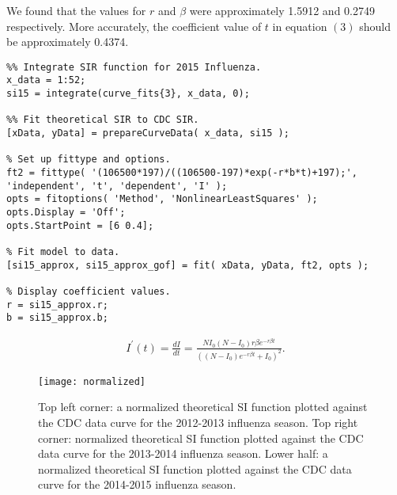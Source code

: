 \documentclass[a0, landscape, final]{a0poster}
\begin{document}
\begin{multicols}{4}
\vfill
\columnbreak

\begin{definition*}[\textcolor{white}{Determining Parameters}]

We found that the values for $r$ and $\beta$ were approximately 1.5912 and 0.2749 respectively. More accurately, the coefficient value of $t$ in equation $(3)$ should be approximately 0.4374. \\

\begin{minipage}{\linewidth}
\begin{lstlisting}
%% Integrate SIR function for 2015 Influenza.
x_data = 1:52;
si15 = integrate(curve_fits{3}, x_data, 0);

%% Fit theoretical SIR to CDC SIR.
[xData, yData] = prepareCurveData( x_data, si15 );

% Set up fittype and options.
ft2 = fittype( '(106500*197)/((106500-197)*exp(-r*b*t)+197);', 'independent', 't', 'dependent', 'I' );
opts = fitoptions( 'Method', 'NonlinearLeastSquares' );
opts.Display = 'Off';
opts.StartPoint = [6 0.4];

% Fit model to data.
[si15_approx, si15_approx_gof] = fit( xData, yData, ft2, opts );

% Display coefficient values.
r = si15_approx.r;
b = si15_approx.b;
\end{lstlisting}
\end{minipage}

\end{definition*}


\begin{definition*}[\textcolor{white}{Results}]
\begin{align}
 I^{\prime}(t) = \frac{dI}{dt} = \frac{ NI_0(N-I_0)r \beta e^{-r\beta t} }{ \left( (N-I_0)e^{-r\beta t} + I_0 \right)^2 }.
\end{align}
%
\begin{figure}[H]
\begin{center}
\texttt{[image: normalized]}
\caption{Top left corner: a normalized theoretical SI function plotted against the CDC data curve for the 2012-2013 influenza season. 
		Top right corner: normalized theoretical SI function plotted against the CDC data curve for the 2013-2014 influenza season.
		Lower half: a normalized theoretical SI function plotted against the CDC data curve for the 2014-2015 influenza season. }
\label{default}
\end{center}
\end{figure}
%
\end{definition*}


\end{multicols}
\end{document}

